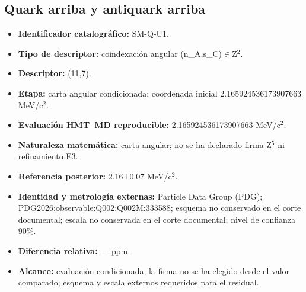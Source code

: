 \subsection{Quark arriba y antiquark arriba}
\begin{itemize}
\item \textbf{Identificador catalográfico:} SM-Q-U1.
\item \textbf{Tipo de descriptor:} coindexación angular (n\_A,s\_C)\(\in\)Z\({}^{2}\).
\item \textbf{Descriptor:} (11,7).
\item \textbf{Etapa:} carta angular condicionada; coordenada inicial 2.165924\allowbreak{}536173\allowbreak{}907663 MeV/c\({}^{2}\).
\item \textbf{Evaluación HMT--MD reproducible:} 2.165924\allowbreak{}536173\allowbreak{}907663 MeV/c\({}^{2}\).
\item \textbf{Naturaleza matemática:} carta angular; no se ha declarado firma Z\({}^{5}\) ni refinamiento E3.
\item \textbf{Referencia posterior:} 2.16±\allowbreak{}0.07 MeV/c\({}^{2}\).
\item \textbf{Identidad y metrología externas:} Particle Data Group (PDG); PDG2026:\allowbreak{}observable:\allowbreak{}Q002:\allowbreak{}Q002M:\allowbreak{}333588; esquema no conservado en el corte documental; escala no conservada en el corte documental; nivel de confianza 90\%.
\item \textbf{Diferencia relativa:} --- ppm.
\item \textbf{Alcance:} evaluación condicionada; la firma no se ha elegido desde el valor comparado; esquema y escala externos requeridos para el residual.
\end{itemize}
